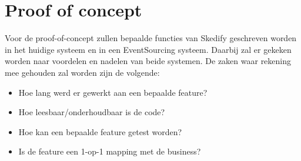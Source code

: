 \section{Proof of concept}
\label{sec:proof-of-concept}

Voor de proof-of-concept zullen bepaalde functies van Skedify geschreven worden in het huidige systeem en in een EventSourcing systeem. Daarbij zal er gekeken worden naar voordelen en nadelen van beide systemen. De zaken waar rekening mee gehouden zal worden zijn de volgende:

\begin{itemize}
  \item{Hoe lang werd er gewerkt aan een bepaalde feature?}
  \item{Hoe leesbaar/onderhoudbaar is de code?}
  \item{Hoe kan een bepaalde feature getest worden?}
  \item{Is de feature een 1-op-1 mapping met de business?}
\end{itemize}
